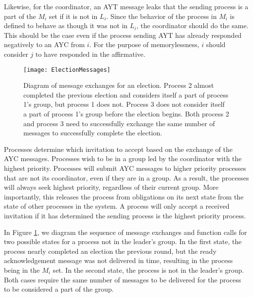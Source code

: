 Likewise, for the coordinator, an \ac{AYT} message leaks that the sending process is a part of the $M_i$ set if it is not in $L_i$.
Since the behavior of the process in $M_i$ is defined to behave as though it was not in $L_i$, the coordinator should do the same.
This should be the case even if the process sending \ac{AYT} has already responded negatively to an \ac{AYC} from $i$.
For the purpose of memorylessness, $i$ should consider $j$ to have responded in the affirmative.

\begin{figure}
\texttt{[image: ElectionMessages]}
\caption[Diagram of message exchanges for an election.]{Diagram of message exchanges for an election. Process 2 almost completed the previous election and considers itself a part of process 1's group, but process 1 does not. Process 3 does not consider itself a part of process 1's group before the election begins. Both process 2 and process 3 need to successfully exchange the same number of messages to successfully complete the election.}
\label{fig:electionmessages}
\end{figure}
Processes determine which invitation to accept based on the exchange of the \ac{AYC} messages.
Processes wish to be in a group led by the coordinator with the highest priority.
Processes will submit AYC messages to higher priority processes that are not its coordinator, even if they are in a group.
As a result, the processes will always seek highest priority, regardless of their current group.
More importantly, this releases the process from obligations on its next state from the state of other processes in the system.
A process will only accept a received invitation if it has determined the sending process is the highest priority process.


In Figure \ref{fig:electionmessages}, we diagram the sequence of message exchanges and function calls for two possible states for a process not in the leader's group.
In the first state, the process nearly completed an election the previous round, but the ready acknowledgement message was not delivered in time, resulting in the process being in the $M_i$ set.
In the second state, the process is not in the leader's group.
Both cases require the same number of messages to be delivered for the process to be considered a part of the group.

